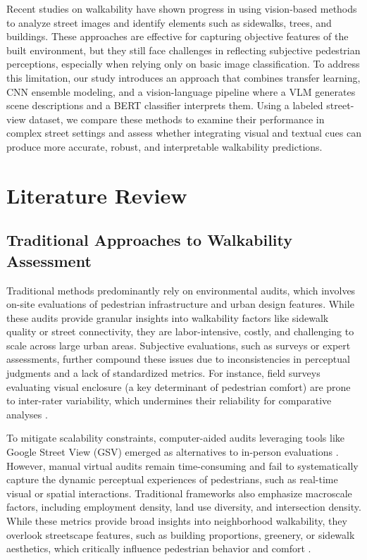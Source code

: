 \documentclass[11pt]{article}
\begin{document}
Recent studies on walkability have shown progress in using vision-based methods to analyze street images and identify elements such as sidewalks, trees, and buildings. These approaches are effective for capturing objective features of the built environment, but they still face challenges in reflecting subjective pedestrian perceptions, especially when relying only on basic image classification. To address this limitation, our study introduces an approach that combines transfer learning, CNN ensemble modeling, and a vision-language pipeline where a VLM generates scene descriptions and a BERT classifier interprets them. Using a labeled street-view dataset, we compare these methods to examine their performance in complex street settings and assess whether integrating visual and textual cues can produce more accurate, robust, and interpretable walkability predictions.

\section{Literature Review}

\subsection{Traditional Approaches to Walkability Assessment}

Traditional methods predominantly rely on environmental audits, which involves on-site evaluations of pedestrian infrastructure and urban design features. While these audits provide granular insights into walkability factors like sidewalk quality or street connectivity, they are labor-intensive, costly, and challenging to scale across large urban areas. Subjective evaluations, such as surveys or expert assessments, further compound these issues due to inconsistencies in perceptual judgments and a lack of standardized metrics. For instance, field surveys evaluating visual enclosure (a key determinant of pedestrian comfort) are prone to inter-rater variability, which undermines their reliability for comparative analyses \citep{dai2024street}.

To mitigate scalability constraints, computer-aided audits leveraging tools like Google Street View (GSV) emerged as alternatives to in-person evaluations \citep{koo2022a}. However, manual virtual audits remain time-consuming and fail to systematically capture the dynamic perceptual experiences of pedestrians, such as real-time visual or spatial interactions. Traditional frameworks also emphasize macroscale factors, including employment density, land use diversity, and intersection density. While these metrics provide broad insights into neighborhood walkability, they overlook streetscape features, such as building proportions, greenery, or sidewalk aesthetics, which critically influence pedestrian behavior and comfort \citep{koo2022b}.
\end{document}
